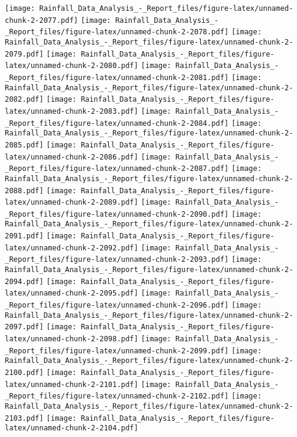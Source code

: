 \documentclass[
]{article}
\begin{document}
\texttt{[image: Rainfall\_Data\_Analysis\_-\_Report\_files/figure-latex/unnamed-chunk-2-2077.pdf]}
\texttt{[image: Rainfall\_Data\_Analysis\_-\_Report\_files/figure-latex/unnamed-chunk-2-2078.pdf]}
\texttt{[image: Rainfall\_Data\_Analysis\_-\_Report\_files/figure-latex/unnamed-chunk-2-2079.pdf]}
\texttt{[image: Rainfall\_Data\_Analysis\_-\_Report\_files/figure-latex/unnamed-chunk-2-2080.pdf]}
\texttt{[image: Rainfall\_Data\_Analysis\_-\_Report\_files/figure-latex/unnamed-chunk-2-2081.pdf]}
\texttt{[image: Rainfall\_Data\_Analysis\_-\_Report\_files/figure-latex/unnamed-chunk-2-2082.pdf]}
\texttt{[image: Rainfall\_Data\_Analysis\_-\_Report\_files/figure-latex/unnamed-chunk-2-2083.pdf]}
\texttt{[image: Rainfall\_Data\_Analysis\_-\_Report\_files/figure-latex/unnamed-chunk-2-2084.pdf]}
\texttt{[image: Rainfall\_Data\_Analysis\_-\_Report\_files/figure-latex/unnamed-chunk-2-2085.pdf]}
\texttt{[image: Rainfall\_Data\_Analysis\_-\_Report\_files/figure-latex/unnamed-chunk-2-2086.pdf]}
\texttt{[image: Rainfall\_Data\_Analysis\_-\_Report\_files/figure-latex/unnamed-chunk-2-2087.pdf]}
\texttt{[image: Rainfall\_Data\_Analysis\_-\_Report\_files/figure-latex/unnamed-chunk-2-2088.pdf]}
\texttt{[image: Rainfall\_Data\_Analysis\_-\_Report\_files/figure-latex/unnamed-chunk-2-2089.pdf]}
\texttt{[image: Rainfall\_Data\_Analysis\_-\_Report\_files/figure-latex/unnamed-chunk-2-2090.pdf]}
\texttt{[image: Rainfall\_Data\_Analysis\_-\_Report\_files/figure-latex/unnamed-chunk-2-2091.pdf]}
\texttt{[image: Rainfall\_Data\_Analysis\_-\_Report\_files/figure-latex/unnamed-chunk-2-2092.pdf]}
\texttt{[image: Rainfall\_Data\_Analysis\_-\_Report\_files/figure-latex/unnamed-chunk-2-2093.pdf]}
\texttt{[image: Rainfall\_Data\_Analysis\_-\_Report\_files/figure-latex/unnamed-chunk-2-2094.pdf]}
\texttt{[image: Rainfall\_Data\_Analysis\_-\_Report\_files/figure-latex/unnamed-chunk-2-2095.pdf]}
\texttt{[image: Rainfall\_Data\_Analysis\_-\_Report\_files/figure-latex/unnamed-chunk-2-2096.pdf]}
\texttt{[image: Rainfall\_Data\_Analysis\_-\_Report\_files/figure-latex/unnamed-chunk-2-2097.pdf]}
\texttt{[image: Rainfall\_Data\_Analysis\_-\_Report\_files/figure-latex/unnamed-chunk-2-2098.pdf]}
\texttt{[image: Rainfall\_Data\_Analysis\_-\_Report\_files/figure-latex/unnamed-chunk-2-2099.pdf]}
\texttt{[image: Rainfall\_Data\_Analysis\_-\_Report\_files/figure-latex/unnamed-chunk-2-2100.pdf]}
\texttt{[image: Rainfall\_Data\_Analysis\_-\_Report\_files/figure-latex/unnamed-chunk-2-2101.pdf]}
\texttt{[image: Rainfall\_Data\_Analysis\_-\_Report\_files/figure-latex/unnamed-chunk-2-2102.pdf]}
\texttt{[image: Rainfall\_Data\_Analysis\_-\_Report\_files/figure-latex/unnamed-chunk-2-2103.pdf]}
\texttt{[image: Rainfall\_Data\_Analysis\_-\_Report\_files/figure-latex/unnamed-chunk-2-2104.pdf]}
\end{document}
